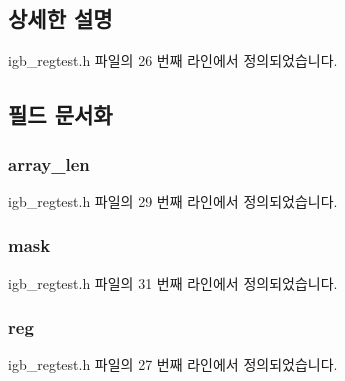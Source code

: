 \subsection{상세한 설명}


igb\+\_\+regtest.\+h 파일의 26 번째 라인에서 정의되었습니다.



\subsection{필드 문서화}
\subsubsection[{\texorpdfstring{array\+\_\+len}{array_len}}]{ array\+\_\+len}\hypertarget{structigb__reg__test_a00736fbf0b697ba670b22ae5c15c2c0b}{}\label{structigb__reg__test_a00736fbf0b697ba670b22ae5c15c2c0b}


igb\+\_\+regtest.\+h 파일의 29 번째 라인에서 정의되었습니다.

\subsubsection[{\texorpdfstring{mask}{mask}}]{ mask}\hypertarget{structigb__reg__test_abef421db8c3f55f9fa7c05727c4ab3e4}{}\label{structigb__reg__test_abef421db8c3f55f9fa7c05727c4ab3e4}


igb\+\_\+regtest.\+h 파일의 31 번째 라인에서 정의되었습니다.

\subsubsection[{\texorpdfstring{reg}{reg}}]{ reg}\hypertarget{structigb__reg__test_a5dcc6445993ff921dac93f4f605bc0c3}{}\label{structigb__reg__test_a5dcc6445993ff921dac93f4f605bc0c3}


igb\+\_\+regtest.\+h 파일의 27 번째 라인에서 정의되었습니다.

